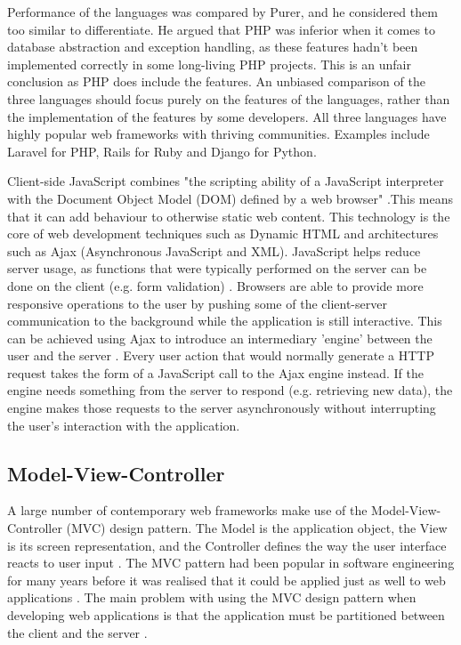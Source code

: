 \documentclass[authoryearcitations]{UoYCSproject}
\begin{document}
Performance of the languages was compared by Purer, and he considered them too similar to differentiate. He argued that PHP was inferior when it comes to database abstraction and exception handling, as these features hadn't been implemented correctly in some long-living PHP projects. This is an unfair conclusion as PHP does include the features. An unbiased comparison of the three languages should focus purely on the features of the languages, rather than the implementation of the features by some developers. All three languages have highly popular web frameworks with thriving communities. Examples include Laravel for PHP, Rails for Ruby and Django for Python.

Client-side JavaScript combines "the scripting ability of a JavaScript interpreter with the Document Object Model (DOM) defined by a web browser" \citep{Flanagan2006a}.This means that it can add behaviour to otherwise static web content. This technology is the core of web development techniques such as Dynamic HTML and architectures such as Ajax (Asynchronous JavaScript and XML). JavaScript helps reduce server usage, as functions that were typically performed on the server can be done on the client (e.g. form validation) \citep{Jazayeri2007}. Browsers are able to provide more responsive operations to the user by pushing some of the client-server communication to the background while the application is still interactive. This can be achieved using Ajax to introduce an intermediary 'engine' between the user and the server \citep{Garrett2005}. Every user action that would normally generate a HTTP request takes the form of a JavaScript call to the Ajax engine instead. If the engine needs something from the server to respond (e.g. retrieving new data), the engine makes those requests to the server asynchronously without interrupting the user's interaction with the application. 


\subsection{Model-View-Controller}

A large number of contemporary web frameworks make use of the Model-View-Controller (MVC) design pattern. The Model is the application object, the View is its screen representation, and the Controller defines the way the user interface reacts to user input \citep{Gamma1995}. The MVC pattern had been popular in software engineering for many years before it was realised that it could be applied just as well to web applications \citep{Jazayeri2007}.  The main problem with using the MVC design pattern when developing web applications is that the application must be partitioned between the client and the server \citep{Leff2001}.
\end{document}
